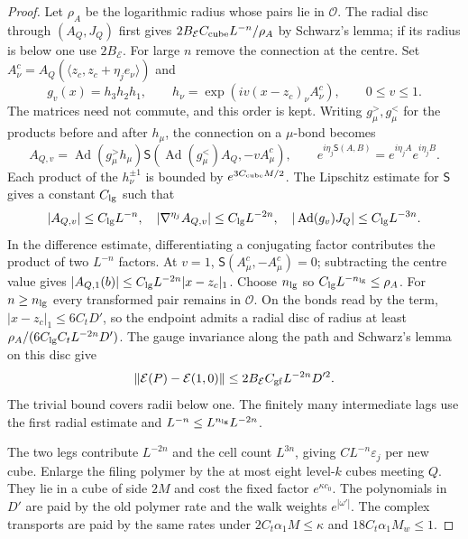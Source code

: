 \documentclass[11pt,letterpaper,reqno]{amsart}
\theoremstyle{definition}
\theoremstyle{remark}
\begin{document}
\begin{proof}
Let $\rho_A$ be the logarithmic radius whose pairs lie in
$\mathcal O$.  The radial disc through $(A_Q,J_Q)$ first
gives $2B_{\mathcal E}C_{\rm cube}L^{-n}/\rho_A$ by
Schwarz's lemma; if its radius is below one use
$2B_{\mathcal E}$.  For large $n$ remove the connection
at the centre.  Set
$A^c_\nu=A_Q(\langle z_c,z_c+\eta_je_\nu\rangle)$ and
\[
 g_v(x)=h_3h_2h_1,\qquad
 h_\nu=\exp(iv(x-z_c)_\nu A^c_\nu),\qquad0\le v\le1.
\]
The matrices need not commute, and this order is kept.
Writing $g^>_\mu,g^<_\mu$ for the products before and
after $h_\mu$, the connection on a $\mu$-bond becomes
\[
 A_{Q,v}=\operatorname{Ad}(g^>_\mu h_\mu)
 \mathsf S(\operatorname{Ad}(g^<_\mu)A_Q,-vA^c_\mu),
 \qquad e^{i\eta_j\mathsf S(A,B)}=e^{i\eta_jA}e^{i\eta_jB}.
\]
Each product of the $h_\nu^{\pm1}$ is bounded by
$e^{3C_{\rm cube}M/2}$.  The Lipschitz estimate for
$\mathsf S$ gives a constant $C_{\rm lg}$ such that
\[
 |A_{Q,v}|\le C_{\rm lg}L^{-n},\quad
 |\nabla^{\eta_j}A_{Q,v}|\le C_{\rm lg}L^{-2n},\quad
 |\operatorname{Ad}(g_v)J_Q|\le C_{\rm lg}L^{-3n}.
\]
In the difference estimate, differentiating a conjugating
factor contributes the product of two $L^{-n}$ factors.
At $v=1$, $\mathsf S(A^c_\mu,-A^c_\mu)=0$; subtracting
the centre value gives
$|A_{Q,1}(b)|\le C_{\rm lg}L^{-2n}|x-z_c|_1$.
Choose $n_{\rm lg}$ so
$C_{\rm lg}L^{-n_{\rm lg}}\le\rho_A$.
For $n\ge n_{\rm lg}$ every transformed pair remains
in $\mathcal O$.  On the bonds read by the term,
$|x-z_c|_1\le6C_tD'$, so the endpoint admits a radial
disc of radius at least
$\rho_A/(6C_{\rm lg}C_tL^{-2n}D')$.
The gauge invariance along the path and Schwarz's lemma
on this disc give
\[
 \|\mathcal E(P)-\mathcal E(1,0)\|
       \le2B_{\mathcal E}C_{\rm gf}L^{-2n}D'^2.
\]
The trivial bound covers radii below one.  The finitely
many intermediate lags use the first radial estimate
and $L^{-n}\le L^{n_{\rm lg}}L^{-2n}$.

The two legs contribute $L^{-2n}$ and the cell count
$L^{3n}$, giving $CL^{-n}\varepsilon_j$ per new cube.
Enlarge the filing polymer by the at most eight level-$k$
cubes meeting $Q$.  They lie in a cube of side $2M$ and
cost the fixed factor $e^{\kappa c_0}$.  The polynomials
in $D'$ are paid by the old polymer rate and the walk
weights $e^{|\omega'|}$.  The complex transports are
paid by the same rates under
$2C_t\alpha_1M\le\kappa$ and
$18C_t\alpha_1M_w\le1$.


\end{proof}
\end{document}
